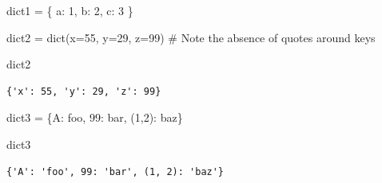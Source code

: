 \documentclass[
  letterpaper,
  DIV=11,
  numbers=noendperiod]{scrreprt}
\newenvironment{Shaded}{\begin{snugshade}}{\end{snugshade}}
\newcommand{\BuiltInTok}[1]{\textcolor[rgb]{0.00,0.23,0.31}{#1}}
\newcommand{\CommentTok}[1]{\textcolor[rgb]{0.37,0.37,0.37}{#1}}
\newcommand{\DecValTok}[1]{\textcolor[rgb]{0.68,0.00,0.00}{#1}}
\newcommand{\NormalTok}[1]{\textcolor[rgb]{0.00,0.23,0.31}{#1}}
\newcommand{\OperatorTok}[1]{\textcolor[rgb]{0.37,0.37,0.37}{#1}}
\newcommand{\StringTok}[1]{\textcolor[rgb]{0.13,0.47,0.30}{#1}}
\begin{document}
\begin{Shaded}
\begin{Highlighting}[]
\NormalTok{dict1 }\OperatorTok{=}\NormalTok{ \{}
    \StringTok{\textquotesingle{}a\textquotesingle{}}\NormalTok{: }\DecValTok{1}\NormalTok{,}
    \StringTok{\textquotesingle{}b\textquotesingle{}}\NormalTok{: }\DecValTok{2}\NormalTok{,}
    \StringTok{\textquotesingle{}c\textquotesingle{}}\NormalTok{: }\DecValTok{3}
\NormalTok{\}}
\end{Highlighting}
\end{Shaded}

\begin{Shaded}
\begin{Highlighting}[]
\NormalTok{dict2 }\OperatorTok{=} \BuiltInTok{dict}\NormalTok{(x}\OperatorTok{=}\DecValTok{55}\NormalTok{, y}\OperatorTok{=}\DecValTok{29}\NormalTok{, z}\OperatorTok{=}\DecValTok{99}\NormalTok{) }\CommentTok{\# Note the absence of quotes around keys}
\end{Highlighting}
\end{Shaded}

\begin{Shaded}
\begin{Highlighting}[]
\NormalTok{dict2}
\end{Highlighting}
\end{Shaded}

\begin{verbatim}
{'x': 55, 'y': 29, 'z': 99}
\end{verbatim}

\begin{Shaded}
\begin{Highlighting}[]
\NormalTok{dict3 }\OperatorTok{=}\NormalTok{ \{}\StringTok{\textquotesingle{}A\textquotesingle{}}\NormalTok{: }\StringTok{\textquotesingle{}foo\textquotesingle{}}\NormalTok{, }\DecValTok{99}\NormalTok{: }\StringTok{\textquotesingle{}bar\textquotesingle{}}\NormalTok{, (}\DecValTok{1}\NormalTok{,}\DecValTok{2}\NormalTok{): }\StringTok{\textquotesingle{}baz\textquotesingle{}}\NormalTok{\}}
\end{Highlighting}
\end{Shaded}

\begin{Shaded}
\begin{Highlighting}[]
\NormalTok{dict3}
\end{Highlighting}
\end{Shaded}

\begin{verbatim}
{'A': 'foo', 99: 'bar', (1, 2): 'baz'}
\end{verbatim}
\end{document}
